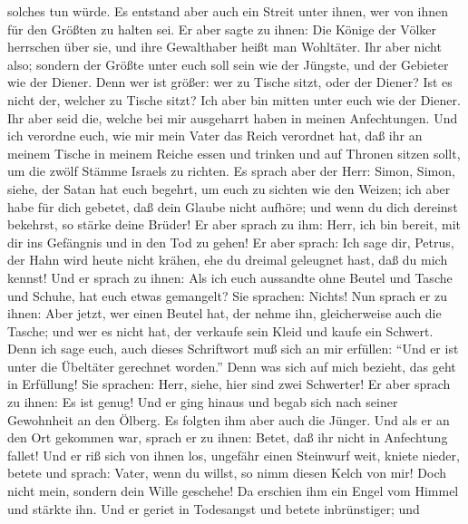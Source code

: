 solches tun würde.  Es entstand aber auch ein Streit
unter ihnen, wer von ihnen für den Größten zu halten sei.
 Er aber sagte zu ihnen: Die Könige der Völker herrschen
über sie, und ihre Gewalthaber heißt man Wohltäter.  Ihr
aber nicht also; sondern der Größte unter euch soll sein wie der
Jüngste, und der Gebieter wie der Diener.  Denn wer ist
größer: wer zu Tische sitzt, oder der Diener? Ist es nicht der, welcher
zu Tische sitzt? Ich aber bin mitten unter euch wie der Diener.
 Ihr aber seid die, welche bei mir ausgeharrt haben in
meinen Anfechtungen.  Und ich verordne euch, wie mir mein
Vater das Reich verordnet hat,  daß ihr an meinem Tische
in meinem Reiche essen und trinken und auf Thronen sitzen sollt, um die
zwölf Stämme Israels zu richten.  Es sprach aber der
Herr: Simon, Simon, siehe, der Satan hat euch begehrt, um euch zu
sichten wie den Weizen;  ich aber habe für dich gebetet,
daß dein Glaube nicht aufhöre; und wenn du dich dereinst bekehrst, so
stärke deine Brüder!  Er aber sprach zu ihm: Herr, ich
bin bereit, mit dir ins Gefängnis und in den Tod zu gehen!
 Er aber sprach: Ich sage dir, Petrus, der Hahn wird
heute nicht krähen, ehe du dreimal geleugnet hast, daß du mich kennst!
 Und er sprach zu ihnen: Als ich euch aussandte ohne
Beutel und Tasche und Schuhe, hat euch etwas gemangelt? Sie sprachen:
Nichts!  Nun sprach er zu ihnen: Aber jetzt, wer einen
Beutel hat, der nehme ihn, gleicherweise auch die Tasche; und wer es
nicht hat, der verkaufe sein Kleid und kaufe ein Schwert.
 Denn ich sage euch, auch dieses Schriftwort muß sich an
mir erfüllen: ``Und er ist unter die Übeltäter gerechnet worden.'' Denn
was sich auf mich bezieht, das geht in Erfüllung!  Sie
sprachen: Herr, siehe, hier sind zwei Schwerter! Er aber sprach zu
ihnen: Es ist genug!  Und er ging hinaus und begab sich
nach seiner Gewohnheit an den Ölberg. Es folgten ihm aber auch die
Jünger.  Und als er an den Ort gekommen war, sprach er zu
ihnen: Betet, daß ihr nicht in Anfechtung fallet!  Und er
riß sich von ihnen los, ungefähr einen Steinwurf weit, kniete nieder,
betete  und sprach: Vater, wenn du willst, so nimm diesen
Kelch von mir! Doch nicht mein, sondern dein Wille geschehe!
 Da erschien ihm ein Engel vom Himmel und stärkte ihn.
 Und er geriet in Todesangst und betete inbrünstiger; und
